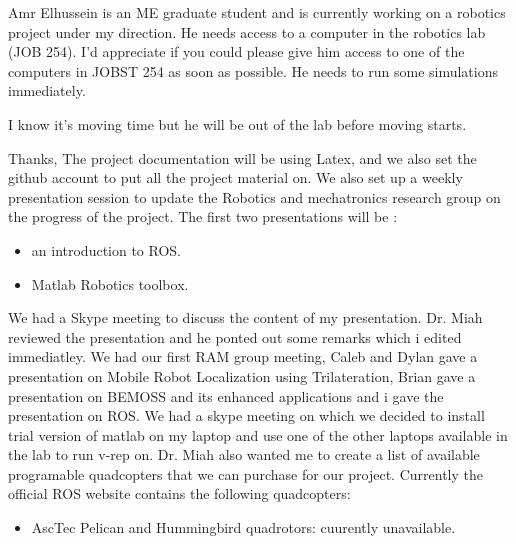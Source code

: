 \documentclass[fontsize=11pt, %
                             paper=letter, %
                             twoside, %
                             captions=tableheading,
                             index=totoc,
                             hyperref]{labbook}
\begin{document}
\begin{addmargin}[0cm]{0cm}
Amr Elhussein is an ME graduate student and is currently working on a 
robotics project under my direction. He needs access to a computer in 
the robotics lab (JOB 254). I'd appreciate if you could please give him 
access to one of the computers in JOBST 254 as soon as possible. He 
needs to run some simulations immediately.

I know it's moving time but he will be out of the lab before moving starts.

Thanks,
\bigbreak\noindent
The project documentation will be using Latex, and we also set the github account to put all the project material on. 
\bigbreak\noindent
We also set up a weekly presentation session to update the Robotics and mechatronics research group on the progress of the project. 
\bigbreak\noindent
The first two presentations will be :
\begin{itemize}
\item an introduction to ROS. 
\item Matlab Robotics toolbox.
\end{itemize} 
We had a Skype meeting to discuss the content of my presentation. Dr. Miah reviewed the presentation and he ponted out some remarks which i edited immediatley. 
We had our first RAM group meeting, Caleb and Dylan gave a presentation on Mobile Robot Localization using Trilateration, Brian gave a presentation on BEMOSS and its enhanced applications and i gave the presentation on ROS. 
We had a skype meeting on which we decided to install trial version of matlab on my laptop and use one of the other laptops available in the lab to run v-rep on. 
\bigbreak\noindent
Dr. Miah also wanted me to create a list of available programable quadcopters that we can purchase for our project. 
\bigbreak\noindent
Currently the official ROS website contains the following quadcopters:
\begin{itemize}
\item AscTec Pelican and Hummingbird quadrotors: cuurently unavailable. 


\end{itemize}
\end{addmargin}
\end{document}
